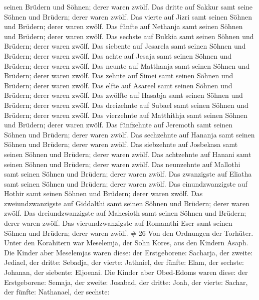 seinen Brüdern und Söhnen; derer waren zwölf.  Das dritte
auf Sakkur samt seine Söhnen und Brüdern; derer waren zwölf.
 Das vierte auf Jizri samt seinen Söhnen und Brüdern;
derer waren zwölf.  Das fünfte auf Nethanja samt seinen
Söhnen und Brüdern; derer waren zwölf.  Das sechste auf
Bukkia samt seinen Söhnen und Brüdern; derer waren zwölf.
 Das siebente auf Jesarela samt seinen Söhnen und
Brüdern; derer waren zwölf.  Das achte auf Jesaja samt
seinen Söhnen und Brüdern; derer waren zwölf.  Das neunte
auf Matthanja samt seinen Söhnen und Brüdern; derer waren zwölf.
 Das zehnte auf Simei samt seinen Söhnen und Brüdern;
derer waren zwölf.  Das elfte auf Asareel samt seinen
Söhnen und Brüdern; derer waren zwölf.  Das zwölfte auf
Hasabja samt seinen Söhnen und Brüdern; derer waren zwölf.
 Das dreizehnte auf Subael samt seinen Söhnen und
Brüdern; derer waren zwölf.  Das vierzehnte auf
Matthithja samt seinen Söhnen und Brüdern; derer waren zwölf.
 Das fünfzehnte auf Jeremoth samt seinen Söhnen und
Brüdern; derer waren zwölf.  Das sechzehnte auf Hananja
samt seinen Söhnen und Brüdern; derer waren zwölf.  Das
siebzehnte auf Josbekasa samt seinen Söhnen und Brüdern; derer waren
zwölf.  Das achtzehnte auf Hanani samt seinen Söhnen und
Brüdern; derer waren zwölf.  Das neunzehnte auf Mallothi
samt seinen Söhnen und Brüdern; derer waren zwölf.  Das
zwanzigste auf Eliatha samt seinen Söhnen und Brüdern; derer waren
zwölf.  Das einundzwanzigste auf Hothir samt seinen
Söhnen und Brüdern; derer waren zwölf.  Das
zweiundzwanzigste auf Giddalthi samt seinen Söhnen und Brüdern; derer
waren zwölf.  Das dreiundzwanzigste auf Mahesioth samt
seinen Söhnen und Brüdern; derer waren zwölf.  Das
vierundzwanzigste auf Romamthi-Eser samt seinen Söhnen und Brüdern;
derer waren zwölf. \# 26  Von den Ordnungen der Torhüter.
Unter den Korahitern war Meselemja, der Sohn Kores, aus den Kindern
Asaph.  Die Kinder aber Meselemjas waren diese: der
Erstgeborene: Sacharja, der zweite: Jediael, der dritte: Sebadja, der
vierte: Jathniel,  der fünfte: Elam, der sechste: Johanan,
der siebente: Eljoenai.  Die Kinder aber Obed-Edoms waren
diese: der Erstgeborene: Semaja, der zweite: Josabad, der dritte: Joah,
der vierte: Sachar, der fünfte: Nathanael,  der sechste:
